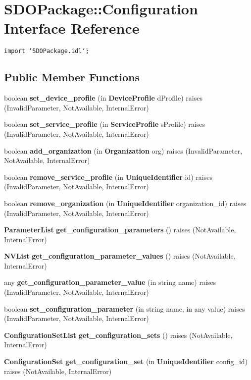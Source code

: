 \section{SDOPackage::Configuration Interface Reference}
\label{interfaceSDOPackage_1_1Configuration}
{\tt import \char`\"{}SDOPackage.idl\char`\"{};}

\subsection*{Public Member Functions}
\begin{CompactItemize}
\item 
boolean {\bf set\_\-device\_\-profile} (in {\bf Device\-Profile} d\-Profile)  raises (Invalid\-Parameter, Not\-Available, Internal\-Error)
\item 
boolean {\bf set\_\-service\_\-profile} (in {\bf Service\-Profile} s\-Profile)  raises (Invalid\-Parameter, Not\-Available, Internal\-Error)
\item 
boolean {\bf add\_\-organization} (in {\bf Organization} org)  raises (Invalid\-Parameter, Not\-Available, Internal\-Error)
\item 
boolean {\bf remove\_\-service\_\-profile} (in {\bf Unique\-Identifier} id)  raises (Invalid\-Parameter, Not\-Available, Internal\-Error)
\item 
boolean {\bf remove\_\-organization} (in {\bf Unique\-Identifier} organization\_\-id)  raises (Invalid\-Parameter, Not\-Available, Internal\-Error)
\item 
{\bf Parameter\-List} {\bf get\_\-configuration\_\-parameters} ()  raises (Not\-Available, Internal\-Error)
\item 
{\bf NVList} {\bf get\_\-configuration\_\-parameter\_\-values} ()  raises (Not\-Available, Internal\-Error)
\item 
any {\bf get\_\-configuration\_\-parameter\_\-value} (in string name)  raises (Invalid\-Parameter, Not\-Available, Internal\-Error)
\item 
boolean {\bf set\_\-configuration\_\-parameter} (in string name, in any value)  raises (Invalid\-Parameter, Not\-Available, Internal\-Error)
\item 
{\bf Configuration\-Set\-List} {\bf get\_\-configuration\_\-sets} ()  raises (Not\-Available, Internal\-Error)
\item 
{\bf Configuration\-Set} {\bf get\_\-configuration\_\-set} (in {\bf Unique\-Identifier} config\_\-id)  raises (Not\-Available, Internal\-Error)

\end{CompactItemize}
